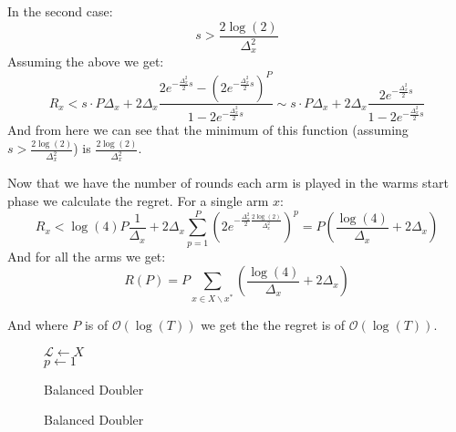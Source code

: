\documentclass{llncs}
\begin{document}
	
	In the second case:
	$$s > \frac{2\log(2)}{\Delta^2_x}$$	
	Assuming the above we get:
	\begin{equation}
		R_x < s\cdot P\Delta_x+2\Delta_x \frac{2 e^{-\frac{\Delta^2_x}{2}s} - (2 e^{-\frac{\Delta^2_x}{2}s})^P}{1-2 e^{-\frac{\Delta^2_x}{2}s}} \sim s\cdot P\Delta_x + 2\Delta_x \frac{2 e^{-\frac{\Delta^2_x}{2}s} }{1-2 e^{-\frac{\Delta^2_x}{2}s}}
	\end{equation}
	And from here we can see that the minimum of this function (assuming $s > \frac{2\log(2)}{\Delta^2_x}$) is $\frac{2\log(2)}{\Delta^2_x}$.

	Now that we have the number of rounds each arm is played in the warms start phase we calculate the regret.
	For a single arm $x$:
	\begin{equation}
	R_x < \log(4)P\frac{1}{\Delta_x} +2\Delta_x\sum\limits_{p=1}^P \left( 2 e^{-\frac{\Delta^2_x}{2}\frac{2\log(2)}{\Delta^2_x}} \right)^p = P(\frac{\log(4)}{\Delta_x}+2\Delta_x)
	\end{equation}
	And for all the arms we get:
	\begin{equation}
	R(P) = P \sum\limits_{x\in X\backslash x^*} (\frac{\log(4)}{\Delta_x}+2\Delta_x)
	\end{equation}
	 
	 And where $P$ is of $\mathcal{O}(\log(T))$ we get the the regret is of $\mathcal{O}(\log(T))$.
		
		\begin{figure}[h]
	\IncMargin{1em}
		\begin{algorithm}[H]
		\BlankLine
		$\mathcal{L} \leftarrow X$\\
		$p\leftarrow 1$\\
			\caption{Balanced Doubler}
		\end{algorithm}
		\caption{Balanced Doubler}\label{algo_balanced_doubler}
	\end{figure}
		
\end{document}
